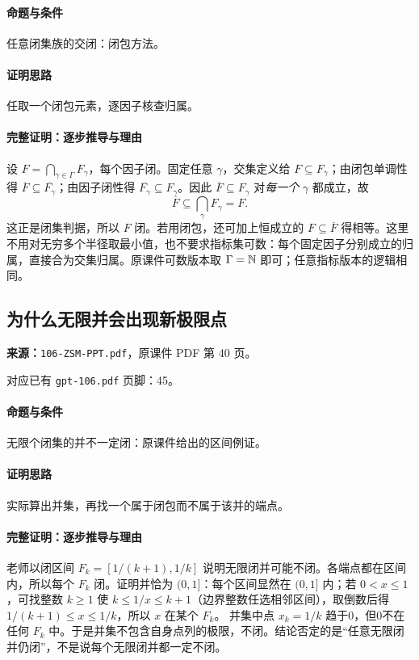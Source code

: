 \paragraph{命题与条件}任意闭集族的交闭：闭包方法。
\paragraph{证明思路}任取一个闭包元素，逐因子核查归属。
\paragraph{完整证明：逐步推导与理由}
设 $F=\bigcap_{\gamma\in\Gamma}F_\gamma$，每个因子闭。固定任意 $\gamma$，交集定义给 $F\subseteq F_\gamma$；由闭包单调性得 $\overline F\subseteq \overline{F_\gamma}$；由因子闭性得 $\overline{F_\gamma}\subseteq F_\gamma$。因此 $\overline F\subseteq F_\gamma$ 对\emph{每一个} $\gamma$ 都成立，故
\[\overline F\subseteq\bigcap_\gamma F_\gamma=F.\]
这正是闭集判据，所以 $F$ 闭。若用闭包，还可加上恒成立的 $F\subseteq\overline F$ 得相等。这里不用对无穷多个半径取最小值，也不要求指标集可数：每个固定因子分别成立的归属，直接合为交集归属。原课件可数版本取 $\Gamma=\mathbb{N}$ 即可；任意指标版本的逻辑相同。
\clearpage\subsection{为什么无限并会出现新极限点}
\textbf{来源：}\texttt{106-ZSM-PPT.pdf}，原课件 PDF 第 40 页。\par
对应已有 \texttt{gpt-106.pdf} 页脚：45。\par
\paragraph{命题与条件}无限个闭集的并不一定闭：原课件给出的区间例证。
\paragraph{证明思路}实际算出并集，再找一个属于闭包而不属于该并的端点。
\paragraph{完整证明：逐步推导与理由}

老师以闭区间 $F_k=[1/(k+1),1/k]$ 说明无限闭并可能不闭。各端点都在区间内，所以每个 $F_k$ 闭。证明并恰为 $(0,1]$：每个区间显然在 $(0,1]$ 内；若 $0<x\le1$，可找整数 $k\ge1$ 使 $k\le1/x\le k+1$（边界整数任选相邻区间），取倒数后得 $1/(k+1)\le x\le1/k$，所以 $x$ 在某个 $F_k$。
并集中点 $x_k=1/k$ 趋于0，但0不在任何 $F_k$ 中。于是并集不包含自身点列的极限，不闭。结论否定的是“任意无限闭并仍闭”，不是说每个无限闭并都一定不闭。

